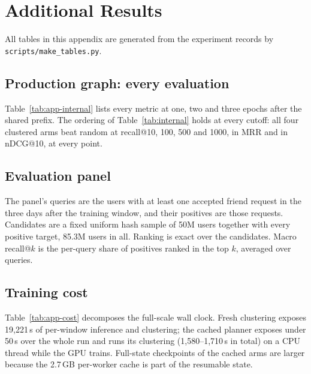 \section{Additional Results}
\label{app:results}

All tables in this appendix are generated from the experiment records by \texttt{scripts/make\_tables.py}.

\subsection{Production graph: every evaluation}
Table~\ref{tab:app-internal} lists every metric at one, two and three epochs after the shared prefix. The ordering of Table~\ref{tab:internal} holds at every cutoff: all four clustered arms beat random at recall@10, 100, 500 and
1000, in MRR and in nDCG@10, at every point.


\subsection{Evaluation panel}
The panel's queries are the users with at least one accepted friend request in the three days after the training window, and their
positives are those requests. Candidates are a fixed uniform hash sample of 50M users together with every positive target, 85.3M users in
all. Ranking is exact over the candidates. Macro recall@$k$ is the per-query share of positives ranked in the top $k$, averaged over
queries.

\subsection{Training cost}
Table~\ref{tab:app-cost} decomposes the full-scale wall clock. Fresh clustering exposes 19{,}221\,s of per-window inference and clustering; the
cached planner exposes under 50\,s over the whole run and runs its clustering (1{,}580--1{,}710\,s in total) on a CPU thread while the GPU trains.
Full-state checkpoints of the cached arms are larger because the 2.7\,GB per-worker cache is part of the resumable state.


